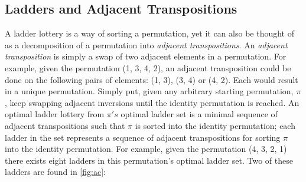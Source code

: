 \subsection{Ladders and Adjacent Transpositions}
A ladder lottery is a way of sorting a permutation, yet it can also be thought of as 
a decomposition of a permutation into \emph{adjacent transpositions}. \cite{A1} 
An \emph{adjacent transposition} is simply a swap of two adjacent elements in a 
permutation. For example, given the permutation (1, 3, 4, 2), an adjacent 
transposition could be done on the following pairs of elements: 
(1, 3), (3, 4) or (4, 2). Each would result in a unique permutation. 
Simply put, given any arbitrary starting permutation, $\pi$, keep swapping 
adjacent inversions until the identity permutation is reached.  An optimal 
ladder lottery from $\pi's$ optimal ladder set is a minimal sequence of 
adjacent transpositions such that $\pi$ is sorted into the identity permutation; 
each ladder in the set represents a sequence of adjacent transpositions for 
sorting $\pi$ into the identity permutation. For example, given the permutation 
(4, 3, 2, 1) there exists eight ladders in this permutation's optimal ladder set. 
Two of these ladders are found in \ref{fig:ac}:

